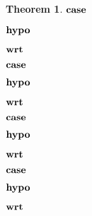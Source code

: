 \documentclass[acmsmall]{acmart}
\theoremstyle{definition}
\newtheorem{theorem}{Theorem}[section]
\begin{document}
\begin{theorem}
    \item \Z $\textbf{case } $
    \item \Z $\textbf{hypo } $
    \item \Z $\textbf{wrt } $

      \item \Z\Z {} 

    \item \Z $\textbf{case } $
    \item \Z $\textbf{hypo } $
    \item \Z $\textbf{wrt } $
      \item \Z\Z {} 

    \item \Z $\textbf{case } $
    \item \Z $\textbf{hypo } $
    \item \Z $\textbf{wrt } $
      \item \Z\Z {} 

    \item \Z $\textbf{case } $
    \item \Z $\textbf{hypo } $
    \item \Z $\textbf{wrt } $
      \item \Z\Z {} 


\end{theorem}
\end{document}
